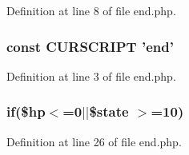 Definition at line 8 of file end.\+php.

\hypertarget{end_8php_a39c39f525eceb86cabc338804f230e80}{
\subsubsection[{C\+U\+R\+S\+C\+R\+I\+P\+T}]{\setlength{\rightskip}{0pt plus 5cm}const C\+U\+R\+S\+C\+R\+I\+P\+T 'end'}}\label{end_8php_a39c39f525eceb86cabc338804f230e80}


Definition at line 3 of file end.\+php.

\hypertarget{end_8php_afc70e9ccbdea0a41fcb004c77b7c7c24}{
\subsubsection[{if}]{\setlength{\rightskip}{0pt plus 5cm}if(\$hp$<$=0$\vert$$\vert$\$state $>$=10)}}\label{end_8php_afc70e9ccbdea0a41fcb004c77b7c7c24}


Definition at line 26 of file end.\+php.

